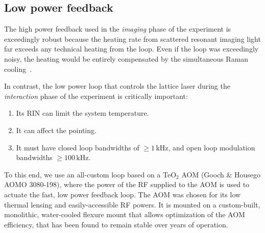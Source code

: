 \documentclass[twocolumn,aps,pra,showpacs,preprintnumbers,bibnotes]{revtex4-1}
\begin{document}
\subsection{Low power feedback}
The high power feedback used in the \textit{imaging} phase of the experiment is exceedingly robust because the heating rate from scattered resonant imaging light far exceeds any technical heating from the loop.
Even if the loop was exceedingly noisy, the heating would be entirely compensated by the simultaneous Raman cooling~\cite{Parsons2015}.

In contrast, the low power loop that controls the lattice laser during the \textit{interaction} phase of the experiment is critically important:
\begin{enumerate}
  \item Its RIN can limit the system temperature.
  \item It can affect the pointing.
  \item It must have closed loop bandwidths of $\geq1\mathrm{\,kHz}$, and open loop modulation bandwidths $\geq 100\mathrm{\,kHz}$.
\end{enumerate}
To this end, we use an all-custom loop based on a TeO$_2$ AOM (Gooch \& Housego AOMO 3080-198), where the power of the RF supplied to the AOM is used to actuate the fast, low power feedback loop.
The AOM was chosen for its low thermal lensing and easily-accessible RF powers.
It is mounted on a custom-built, monolithic, water-cooled flexure mount that allows optimization of the AOM efficiency, that has been found to remain stable over years of operation.
\end{document}
